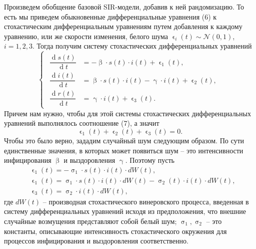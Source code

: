 \documentclass[a4paper, 12pt]{extarticle}
\numberwithin{equation}{section}
\renewcommand{\beta}{\upbeta}
\renewcommand{\gamma}{\upgamma}
\renewcommand{\sigma}{\upsigma}
\renewcommand{\d}{\operatorname{d}}
\renewcommand{\epsilon}{\upvarepsilon}
\begin{document}
	Произведем обобщение базовой SIR-модели, добавив к ней рандомизацию. То есть мы приведем обыкновенные дифференциальные уравнения (6) к стохастическим дифференциальным уравнениям путем добавления к каждому уравнению, или же скорости изменения, белого шума $\epsilon_i(t) \sim \mathcal N (0,1)$, $i=1,2,3$. Тогда получим систему стохастических дифференциальных уравнений 
	\begin{equation}
		\left\{ 
		\begin{gathered} 
			\begin{aligned}
				\dfrac {\d s(t)}{\d t} &= -\beta \cdot s(t) \cdot i(t) + \epsilon_1(t),\\
				\dfrac{\d i(t)}{\d t} &= \beta \cdot s(t)\cdot i(t) - \gamma\cdot i(t) + \epsilon_2(t),\\
				\dfrac{\d r(t)}{\d t} &= \gamma\cdot i(t) + \epsilon_3(t). 
			\end{aligned}
		\end{gathered} 
		\right.		
	\end{equation}
	Причем нам нужно, чтобы для этой системы стохастических дифференциальных уравнений выполнялось соотношение (7), а значит \begin{equation}
		\epsilon_1(t) + \epsilon_2(t) + \epsilon_3(t) = 0.
	\end{equation}
	Чтобы это было верно, зададим случайный шум следующим образом.
	По сути единственные значения, в которых может появиться шум -- это интенсивности инфицирования $\beta$ и выздоровления $\gamma$. Поэтому
	пусть \begin{eqnarray}
		&\epsilon_1(t) = -\sigma_1 \cdot s(t)\cdot i(t) \cdot dW(t),\\
		&\epsilon_1(t) = \sigma_1 \cdot s(t)\cdot i(t) \cdot dW(t) - \sigma_2(t)\cdot i(t)\cdot dW(t),\\
		&\epsilon_3(t) = \sigma_2 \cdot i(t) \cdot dW(t),
	\end{eqnarray}
	где $dW (t)$ – производная стохастического винеровского процесса, введенная
	в систему дифференциальных уравнений исходя из предположения, что внешние
	случайные возмущения представляют собой белый шум; $\sigma_1, \sigma_2$ -- это константы, описывающие интенсивность стохастического окружения для процессов инфицирования
	и выздоровления соответственно. 
	
\end{document}
